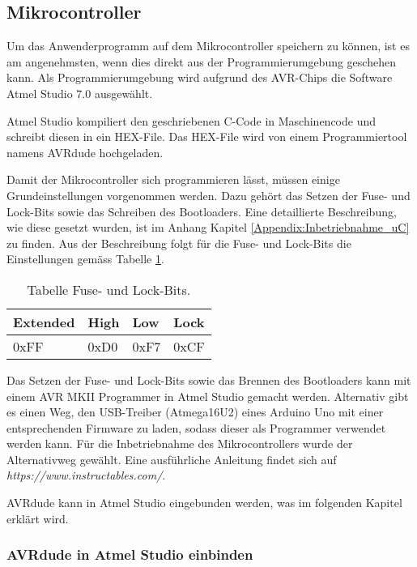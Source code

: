 \subsection{Mikrocontroller}
\label{subsec:Inbetriebnahme_Mikrocontroller}

Um das Anwenderprogramm auf dem Mikrocontroller speichern zu können, ist es am angenehmsten, wenn dies direkt aus der Programmierumgebung geschehen kann. Als Programmierumgebung wird aufgrund des AVR-Chips die Software Atmel Studio 7.0 ausgewählt.

Atmel Studio kompiliert den geschriebenen C-Code in Maschinencode und schreibt diesen in ein HEX-File. Das HEX-File wird von einem Programmiertool namens AVRdude hochgeladen.\cite{verschiedene_autoren_avrdude_2019}


Damit der Mikrocontroller sich programmieren lässt, müssen einige Grundeinstellungen vorgenommen werden. Dazu gehört das Setzen der Fuse- und Lock-Bits sowie das Schreiben des Bootloaders. Eine detaillierte Beschreibung, wie diese gesetzt wurden, ist im Anhang Kapitel \ref{Appendix:Inbetriebnahme_uC} zu finden. Aus der Beschreibung folgt für die Fuse- und Lock-Bits die Einstellungen gemäss Tabelle \ref{tab:Fuse_und_Lock-Bits}.

\begin{table}[h!]
\center
\begin{tabular}{|l|l|l|l|}
\hline
\textbf{Extended} & \textbf{High} & \textbf{Low} & \textbf{Lock}\\
\hline
0xFF & 0xD0 & 0xF7 & 0xCF\\
\hline
\end{tabular}
\caption{Tabelle Fuse- und Lock-Bits.}
\label{tab:Fuse_und_Lock-Bits}
\end{table}

Das Setzen der Fuse- und Lock-Bits sowie das Brennen des Bootloaders kann mit einem AVR MKII Programmer in Atmel Studio gemacht werden. Alternativ gibt es einen Weg, den USB-Treiber (Atmega16U2) eines Arduino Uno mit einer entsprechenden Firmware zu laden, sodass dieser als Programmer verwendet werden kann. Für die Inbetriebnahme des Mikrocontrollers wurde der Alternativweg gewählt. Eine ausführliche Anleitung findet sich auf \textit{https://www.instructables.com/}. \cite{vidmofollow_turn_2017}

AVRdude kann in Atmel Studio eingebunden werden, was im folgenden Kapitel erklärt wird.

\subsubsection{AVRdude in Atmel Studio einbinden}\label{subsubsec:avrdude_in_atmelstudio_einbinden}

